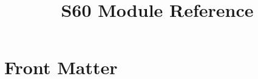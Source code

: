 \documentclass{manual}
\title{S60 Module Reference}
\begin{document}
\maketitle

\ifhtml
\chapter*{Front Matter\label{front}}
\fi


\begin{abstract}
\noindent

\end{abstract}

\tableofcontents
\end{document}
